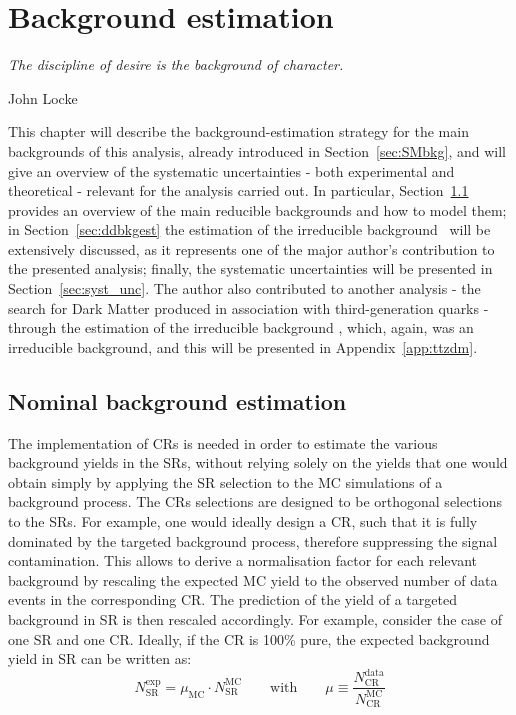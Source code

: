 \chapter{Background estimation}
\label{ch:bkgest}
\epigraph{\emph{The discipline of desire is the background of character.}}{John Locke}

	This chapter will describe the background-estimation strategy for the main backgrounds of this analysis, already introduced in Section~\ref{sec:SMbkg}, and will give an overview of the systematic uncertainties - both experimental and theoretical - relevant for the analysis carried out. In particular, Section~\ref{sec:bkgest} provides an overview of the main reducible backgrounds and how to model them; in Section~\ref{sec:ddbkgest} the estimation of the irreducible background \ttZ\ will be extensively discussed, as it represents one of the major author's contribution to the presented analysis; finally, the systematic uncertainties will be presented in Section~\ref{sec:syst_unc}. The author also contributed to another analysis - the search for Dark Matter produced in association with third-generation quarks - through the estimation of the irreducible background \ttZ, which, again, was an irreducible background, and this will be presented in Appendix~\ref{app:ttzdm}. 

	\section{Nominal background estimation}
	\label{sec:bkgest}

		The implementation of \acp{CR} is needed in order to estimate the various background yields in the \acp{SR}, without relying solely on the yields that one would obtain simply by applying the \ac{SR} selection to the \ac{MC} simulations of a background process. The \acp{CR} selections are designed to be orthogonal selections to the \acp{SR}. For example, one would ideally design a \ac{CR}, such that it is fully dominated by the targeted background process, therefore suppressing the signal contamination. This allows to derive a normalisation factor for each relevant background by rescaling the expected \ac{MC} yield to the observed number of data events in the corresponding \ac{CR}. The prediction of the yield of a targeted background in \ac{SR} is then rescaled accordingly. For example, consider the case of one \ac{SR} and one \ac{CR}. Ideally, if the \ac{CR} is 100\% pure, the expected background yield in \ac{SR} can be written as:
		\begin{equation}
			N_{\mathrm{SR}}^{\mathrm{exp}} = \mu_{\mathrm{MC}} \cdot N_{\mathrm{SR}}^{\mathrm{MC}} \qquad \mathrm{with}\qquad \mu \equiv \frac{N_{\mathrm{CR}}^{\mathrm{data}}}{N_{\mathrm{CR}}^{\mathrm{MC}}}
		\label{eq:exp_bkgyield}
		\end{equation}

